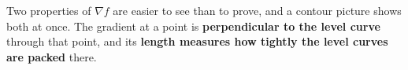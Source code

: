 \begin{remark}
\label{rem:gradient_and_level_curves}
Two properties of $\nabla f$ are easier to see than to prove, and a contour picture shows both at
once. The gradient at a point is \textbf{perpendicular to the level curve} through that point,
and its \textbf{length measures how tightly the level curves are packed} there.
\begin{center}
\end{center}
\end{remark}
